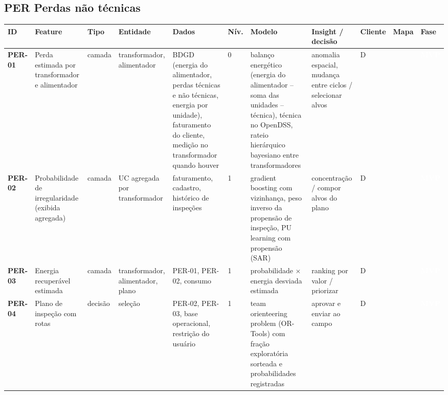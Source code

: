 \subsection*{PER \textperiodcentered{} Perdas não técnicas}
\label{cat:PER}
{\footnotesize\setlength{\tabcolsep}{3pt}
\begin{longtable}{@{}P{1.35cm}P{4.1cm}P{1.3cm}P{3.1cm}P{3.7cm}C{0.6cm}P{3.6cm}P{3.3cm}P{1.1cm}P{0.9cm}P{1.1cm}@{}}
\toprule
\textbf{ID} & \textbf{Feature} & \textbf{Tipo} & \textbf{Entidade} & \textbf{Dados} & \textbf{Nív.} & \textbf{Modelo} & \textbf{Insight / decisão} & \textbf{Cliente} & \textbf{Mapa} & \textbf{Fase} \\
\midrule\endhead
\textbf{PER-01} & Perda estimada por transformador e alimentador & camada & transformador, alimentador & BDGD (energia do alimentador, perdas técnicas e não técnicas, energia por unidade), faturamento do cliente, medição no transformador quando houver & 0 & balanço energético (energia do alimentador -- soma das unidades -- técnica), técnica no OpenDSS, rateio hierárquico bayesiano entre transformadores & anomalia espacial, mudança entre ciclos / selecionar alvos & D &  & \colorbox{fMVP}{\scriptsize \textcolor{white}{\textbf{MVP}}} \\
\textbf{PER-02} & Probabilidade de irregularidade (exibida agregada) & camada & UC agregada por transformador & faturamento, cadastro, histórico de inspeções & 1 & gradient boosting com vizinhança, peso inverso da propensão de inspeção, PU learning com propensão (SAR) & concentração / compor alvos do plano & D &  & \colorbox{fMVP}{\scriptsize \textcolor{white}{\textbf{MVP}}} \\
\textbf{PER-03} & Energia recuperável estimada & camada & transformador, alimentador, plano & PER-01, PER-02, consumo & 1 & probabilidade $\times$ energia desviada estimada & ranking por valor / priorizar & D &  & \colorbox{fMVP}{\scriptsize \textcolor{white}{\textbf{MVP}}} \\
\textbf{PER-04} & Plano de inspeção com rotas & decisão & seleção & PER-02, PER-03, base operacional, restrição do usuário & 1 & team orienteering problem (OR-Tools) com fração exploratória sorteada e probabilidades registradas & aprovar e enviar ao campo & D &  & \colorbox{fMVP}{\scriptsize \textcolor{white}{\textbf{MVP}}} \\

\end{longtable}}
